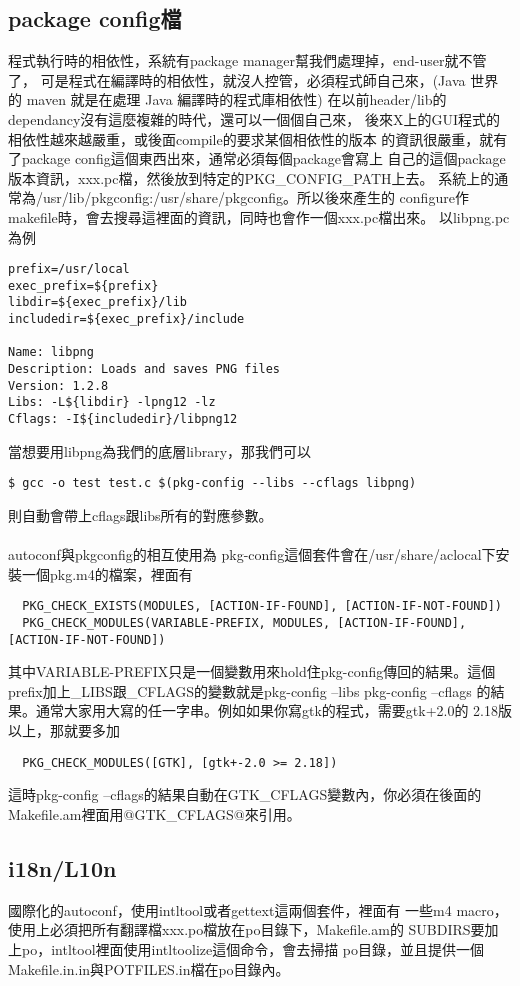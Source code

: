   \subsection{package config檔}
  程式執行時的相依性，系統有package manager幫我們處理掉，end-user就不管了，
  可是程式在編譯時的相依性，就沒人控管，必須程式師自己來，(Java 世界 的 maven
  就是在處理 Java 編譯時的程式庫相依性)
  在以前header/lib的dependancy沒有這麼複雜的時代，還可以一個個自己來，
  後來X上的GUI程式的相依性越來越嚴重，或後面compile的要求某個相依性的版本
  的資訊很嚴重，就有了package config這個東西出來，通常必須每個package會寫上
  自己的這個package版本資訊，xxx.pc檔，然後放到特定的PKG\_CONFIG\_PATH上去。
  系統上的通常為/usr/lib/pkgconfig:/usr/share/pkgconfig。所以後來產生的
  configure作makefile時，會去搜尋這裡面的資訊，同時也會作一個xxx.pc檔出來。
  以libpng.pc為例
  \begin{verbatim} 
prefix=/usr/local
exec_prefix=${prefix}
libdir=${exec_prefix}/lib
includedir=${exec_prefix}/include

Name: libpng
Description: Loads and saves PNG files
Version: 1.2.8
Libs: -L${libdir} -lpng12 -lz
Cflags: -I${includedir}/libpng12
  \end{verbatim} 
  當想要用libpng為我們的底層library，那我們可以
  \begin{verbatim} 
$ gcc -o test test.c $(pkg-config --libs --cflags libpng)
  \end{verbatim} 
  則自動會帶上cflags跟libs所有的對應參數。
  \\\\
  autoconf與pkgconfig的相互使用為
  pkg-config這個套件會在/usr/share/aclocal下安裝一個pkg.m4的檔案，裡面有
  \begin{verbatim} 
  PKG_CHECK_EXISTS(MODULES, [ACTION-IF-FOUND], [ACTION-IF-NOT-FOUND])
  PKG_CHECK_MODULES(VARIABLE-PREFIX, MODULES, [ACTION-IF-FOUND], [ACTION-IF-NOT-FOUND])
  \end{verbatim} 
  其中VARIABLE-PREFIX只是一個變數用來hold住pkg-config傳回的結果。這個
  prefix加上\_LIBS跟\_CFLAGS的變數就是pkg-config --libs pkg-config --cflags
  的結果。通常大家用大寫的任一字串。例如如果你寫gtk的程式，需要gtk+2.0的
  2.18版以上，那就要多加
  \begin{verbatim} 
  PKG_CHECK_MODULES([GTK], [gtk+-2.0 >= 2.18])
  \end{verbatim} 
  這時pkg-config --cflags的結果自動在GTK\_CFLAGS變數內，你必須在後面的
  Makefile.am裡面用@GTK\_CFLAGS@來引用。
  \subsection{i18n/L10n}
  國際化的autoconf，使用intltool或者gettext這兩個套件，裡面有
  一些m4 macro，
  使用上必須把所有翻譯檔xxx.po檔放在po目錄下，Makefile.am的
  SUBDIRS要加上po，intltool裡面使用intltoolize這個命令，會去掃描
  po目錄，並且提供一個Makefile.in.in與POTFILES.in檔在po目錄內。
  
